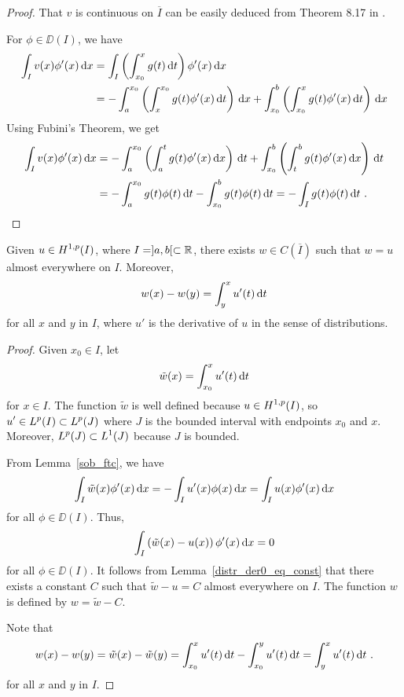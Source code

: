 \begin{proof}
That $v$ is continuous on $\overline{I}$ can be easily deduced from
Theorem 8.17 in \cite{Ru}.

For $\phi \in \DD(I)$, we have
\begin{align*}
\int_I v(x) \phi'(x) \,\mathrm{d}{x} &= \int_I \left( \int_{x_0}^x g(t)
  \,\mathrm{d}{t} \right) \phi'(x) \,\mathrm{d}{x} \\
&= -\int_a^{x_0} \left( \int_x^{x_0} g(t) \phi'(x) \,\mathrm{d}{t}\right) \,\mathrm{d}{x}
+ \int_{x_0}^b \left( \int_{x_0}^x g(t) \phi'(x) \,\mathrm{d}{t}\right) \,\mathrm{d}{x}
\end{align*}
Using Fubini's Theorem, we get
\begin{align*}
\int_I v(x) \phi'(x) \dx{x} &=
-\int_a^{x_0} \left( \int_a^t g(t) \phi'(x) \dx{x}\right) \dx{t}
+ \int_{x_0}^b \left( \int_t^b g(t) \phi'(x) \dx{x}\right) \dx{t} \\
&= -\int_a^{x_0} g(t) \phi(t) \dx{t}
- \int_{x_0}^b g(t) \phi(t) \dx{t} = - \int_I g(t) \phi(t) \dx{t} \ .  \qedhere
\end{align*}
\end{proof}

\begin{theorem} \label{sob_ader}
Given $\displaystyle u \in H^{1,p}(I)$, where $I = ]a,b[ \subset \mathbb{R}$,
there exists $w \in C(\overline{I})$ such that $w=u$ almost everywhere on $I$.
Moreover,
\[
w(x) - w(y) = \int_y^x u'(t) \,\mathrm{d}{t}
\]
for all $x$ and $y$ in $I$, where $u'$ is the derivative of $u$ in
the sense of distributions.
\end{theorem}

\begin{proof}
Given $x_0 \in I$, let
\[
\tilde{w}(x) = \int_{x_0}^x u'(t) \,\mathrm{d}{t}
\]
for $x \in I$.  The function $\tilde{w}$ is well defined because
$\displaystyle u \in H^{1,p}(I)$, so
$\displaystyle u' \in L^p(I) \subset L^p(J)$
where $J$ is the bounded interval with endpoints $x_0$ and
$x$.  Moreover, $\displaystyle L^p(J) \subset L^1(J)$ because $J$ is bounded.

From Lemma~\ref{sob_ftc}, we have
\[
\int_I \tilde{w}(x) \phi'(x) \,\mathrm{d}{x} = - \int_I u'(x) \phi(x) \,\mathrm{d}{x}
= \int_I u(x) \phi'(x) \,\mathrm{d}{x}
\]
for all $\phi \in \DD(I)$.  Thus,
\[
\int_I \left( \tilde{w}(x) - u(x)\right) \phi'(x) \,\mathrm{d}{x} = 0
\]
for all $\phi \in \DD(I)$.  It follows from
Lemma~\ref{distr_der0_eq_const} that there exists a constant $C$ such
that $\tilde{w} - u = C$ almost everywhere on $I$.  The function $w$
is defined by $w = \tilde{w} - C$.

Note that
\[
w(x) - w(y) = \tilde{w}(x) - \tilde{w}(y) =
\int_{x_0}^x u'(t) \,\mathrm{d}{t} - \int_{x_0}^y u'(t) \,\mathrm{d}{t}
= \int_y^x u'(t) \,\mathrm{d}{t} \ .
\]
for all $x$ and $y$ in $I$.
\end{proof}

